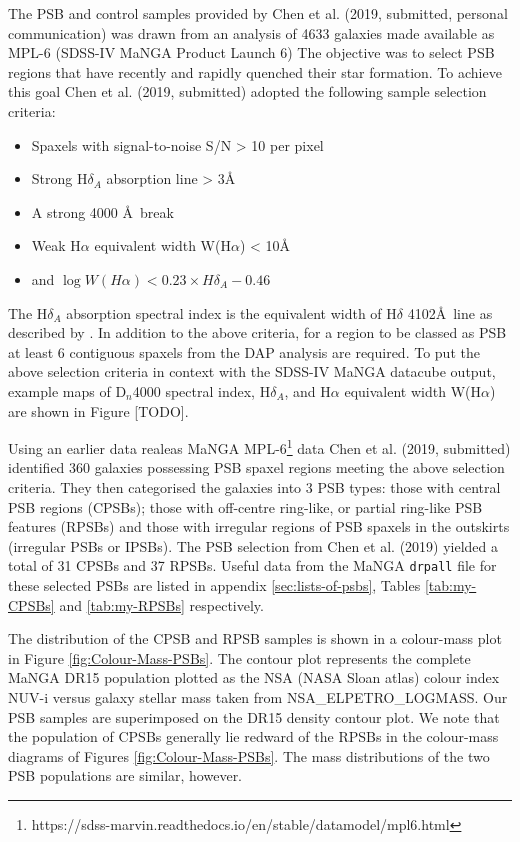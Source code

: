 The PSB and control samples provided by Chen et al. (2019, submitted, personal communication) was drawn from an analysis of 4633 galaxies made available as MPL-6 (SDSS-IV MaNGA Product Launch 6) The objective was to select PSB regions that have recently and rapidly quenched their star formation.  To achieve this goal Chen et al. (2019, submitted) adopted the following sample selection criteria:
\begin{itemize}
    \item Spaxels with signal-to-noise S/N > 10 per pixel
    \item Strong H$\delta_A$ absorption line > 3\AA 
    \item A strong 4000 \AA\ break 
    \item Weak H$\alpha$ equivalent width W(H$\alpha$) < 10\AA
    \item and $\log{W(H\alpha)} < 0.23\times{H\delta_A}-0.46$
\end{itemize}
The H$\delta_A$ absorption spectral index is the equivalent width of H$\delta$ 4102\AA\ line as described by \citet{1994ApJS...94..687W}. In addition to the above criteria, for a region to be classed as PSB at least 6 contiguous spaxels from the DAP analysis are required. To put the above selection criteria in context with the SDSS-IV MaNGA datacube output, example maps of D$_n$4000 spectral index, H$\delta_A$, and H$\alpha$ equivalent width W(H$\alpha$) are shown in Figure [TODO]. 

Using an earlier data realeas MaNGA MPL-6\footnote{https://sdss-marvin.readthedocs.io/en/stable/datamodel/mpl6.html} data Chen et al. (2019, submitted) identified 360 galaxies possessing PSB spaxel regions meeting the above selection criteria. They then categorised the galaxies into 3 PSB types: those with central PSB regions (CPSBs); those with off-centre ring-like, or partial ring-like PSB features (RPSBs) and those with irregular regions of PSB spaxels in the outskirts (irregular PSBs or IPSBs). The PSB selection from Chen et al. (2019) yielded a total of 31 CPSBs and 37 RPSBs. Useful data from the MaNGA \texttt{drpall} file for these selected PSBs are listed in appendix \ref{sec:lists-of-psbs}, Tables \ref{tab:my-CPSBs} and \ref{tab:my-RPSBs} respectively. 

The distribution of the CPSB and RPSB samples is shown in a colour-mass plot in Figure \ref{fig:Colour-Mass-PSBs}. The contour plot represents the complete MaNGA DR15 population plotted as the NSA (NASA Sloan atlas) colour index NUV-i versus galaxy stellar mass taken from NSA\_ELPETRO\_LOGMASS. Our PSB samples are superimposed on the DR15 density contour plot. We note that the population of CPSBs generally lie redward of the RPSBs in the colour-mass diagrams of Figures \ref{fig:Colour-Mass-PSBs}. The mass distributions of the two PSB populations are similar, however.

